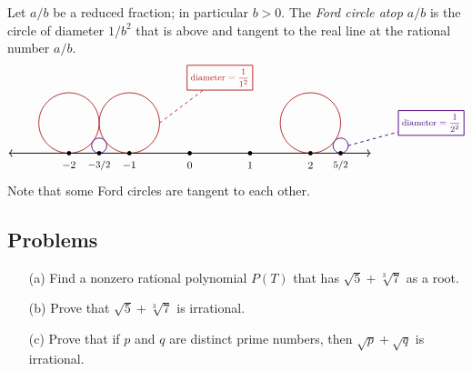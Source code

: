 \begin{definition}
Let $a/b$ be a reduced fraction; in particular $b>0$. The \emph{Ford circle atop $a/b$} is the circle of diameter $1/b^2$ that is above and tangent to the real line at the rational number $a/b$.
\[\begin{tikzpicture}[scale=2]
    \draw[thick,color=firebrick](-2,0.5) circle (0.5);
    \draw[thick,color=firebrick](-1,0.5) circle (0.5);
    \draw[thick,color=indigo](-1.5,0.125) circle (0.125);
    \draw[thick,color=firebrick](2,0.5) circle (0.5);
    \draw[thick,color=indigo](2.5,0.125) circle (0.125);
    \draw[<->,thick] (-3,0)--(3,0);
    \foreach \x in {-2,-1,0,1,2,2.5,-1.5}
    {
    \fill (\x,0) circle (1pt);
    }
    \node[] at (0,-0.2) {$0$};
    \node[] at (1,-0.2) {$1$};
    \node[] at (2,-0.2) {$2$};
    \node[] at (-1,-0.2) {$-1$};
    \node[] at (-2,-0.2) {$-2$};
    \node[] at (-1.5,-0.2) {\small $-3/2$};
    \node[] at (2.5,-0.2) {\small $5/2$};
    \node[draw,color=firebrick,thick](A) at (0.5,1.25) {\footnotesize diameter $=\dfrac{1}{1^2}$};
    \node[draw,color=indigo,thick](B) at (4,0.5) {\footnotesize diameter $=\dfrac{1}{2^2}$};
    \draw[dashed,color=firebrick,thick] (-0.5,0.5)--(A);
    \draw[dashed,color=indigo,thick] (2.625,0.125)--(B);
\end{tikzpicture}\]
Note that some Ford circles are tangent to each other.
\end{definition}

\vspace*{0.5in}

\subsection{Problems}
\vspace{0.1in}

\begin{problem}\label{Problem 6.1}\hfill
\begin{itemize}
\item[(a)] Find a nonzero rational polynomial $P(T)$ that has $\sqrt{5} + \sqrt[3]{7}$ as a root.
\item[(b)] Prove that $\sqrt{5} + \sqrt[3]{7}$ is irrational.
\item[(c)] Prove that if $p$ and $q$ are distinct prime numbers, then $\sqrt{p} + \sqrt{q}$ is irrational.
\end{itemize}
\end{problem}

\vspace*{0.1in}

